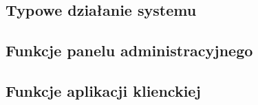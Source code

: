 \documentclass[../opis-rozwiazania.tex]{subfiles}
\begin{document}
\label{system_interaction}

\subsection{Typowe działanie systemu}

\subsection{Funkcje panelu administracyjnego}

\subsection{Funkcje aplikacji klienckiej}
\end{document}
